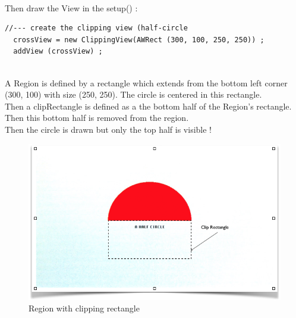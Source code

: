 \documentclass[a4paper,11pt]{extarticle}
\begin{document}
~\\ Then draw the View in the setup() :
\begin{lstlisting}[language=Arduinonl]
//--- create the clipping view (half-circle
  crossView = new ClippingView(AWRect (300, 100, 250, 250)) ;
  addView (crossView) ;
\end{lstlisting}

~\\ A Region is defined by a rectangle which extends from the bottom left corner (300, 100) with size (250, 250). The circle is centered in this rectangle.
~\\ Then a clipRectangle is defined as a the bottom half of the Region's rectangle.
~\\ Then this bottom half is removed from the region.
~\\ Then the circle is drawn but only the top half is visible !

\begin{figure}[htbp]
   \centering
   \includegraphics[scale=0.55]{AWFig8.png} 
   \caption{Region with clipping rectangle}
   \label{fig:8 }
\end{figure}
\end{document}
